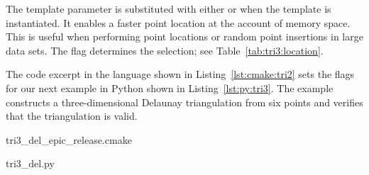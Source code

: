 The template parameter  is substituted
with either  or
 when the template
is instantiated. It enables a faster point location at the account of
memory space. This is useful when performing point locations or random
point insertions in large data sets.  The \cmake{} flag
 determines the
selection; see Table~\ref{tab:tri3:location}.

\begin{table}[!htp]
  \caption{3D triangulation location policy options}
  \centering{}
  \label{tab:tri3:location}
\end{table}

The code excerpt in the \cmake{} language shown in
Listing~\ref{lst:cmake:tri2} sets the \cmake{} flags for our next
example in Python shown in Listing~\ref{lst:py:tri3}. The example
constructs a three-dimensional Delaunay triangulation from six points
and verifies that the triangulation is valid.

\begin{lstfloat}
  \def\filename{tri3_del_epic_release.cmake}%
  
                  {\cmakeDir\filename}
\end{lstfloat}

\begin{lstfloat}
  \def\filename{tri3_del.py}%
  
                  {\pythonDir\filename}
\end{lstfloat}

